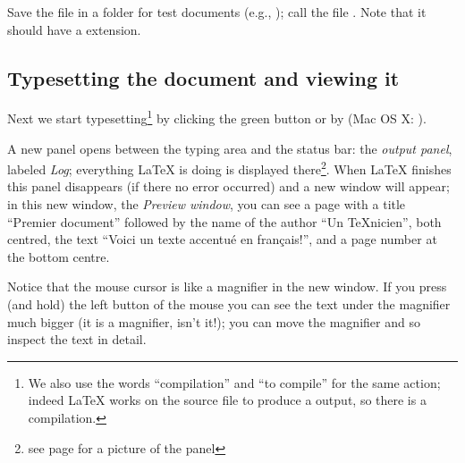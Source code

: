 
Save the file in a folder for test documents (e.g., ); call the file . Note that it should have a  extension.

\subsection{Typesetting the document and viewing it}

Next we start typesetting\footnote{We also use the words ``compilation'' and ``to compile'' for the same action; indeed {\LaTeX} works on the source file to produce a  output, so there is a compilation.} by clicking the green button 
or by  (Mac OS X: ).

A new panel opens between the typing area and the status bar: the \emph{output panel}, labeled \emph{Log}; everything {\LaTeX} is doing is displayed there\footnote{see page \pageref{fig:consoleOutput} for a picture of the panel}. When {\LaTeX} finishes this panel disappears (if there no error occurred) and a new window will appear; in this new window, the \emph{Preview window}, you can see a page with a title \foreignlanguage{frenchb}{``Premier document''} followed by the name of the author \foreignlanguage{frenchb}{``Un TeXnicien''}, both centred, the text
\foreignlanguage{frenchb}{``Voici un texte accentué en français!''}, and a page number at the bottom centre.

Notice that the mouse cursor is like a magnifier in the new window. If you press (and hold) the left button of the mouse you can see the text under the magnifier much bigger (it is a magnifier, isn't it!); you can move the magnifier and so inspect the text in detail.

